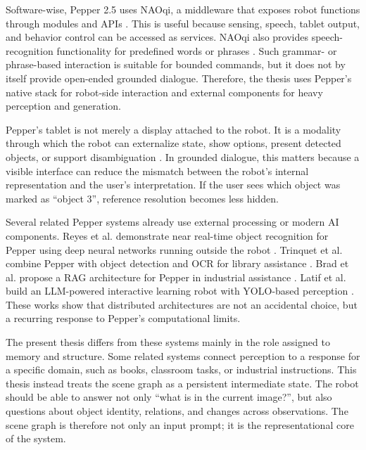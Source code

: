 Software-wise, Pepper 2.5 uses NAOqi, a middleware that exposes robot functions through modules and APIs \cite{softbank_python_sdk_2026}. This is useful because sensing, speech, tablet output, and behavior control can be accessed as services. NAOqi also provides speech-recognition functionality for predefined words or phrases \cite{softbank_alspeechrecognition_2026}. Such grammar- or phrase-based interaction is suitable for bounded commands, but it does not by itself provide open-ended grounded dialogue. Therefore, the thesis uses Pepper's native stack for robot-side interaction and external components for heavy perception and generation.

Pepper's tablet is not merely a display attached to the robot. It is a modality through which the robot can externalize state, show options, present detected objects, or support disambiguation \cite{softbank_peppers_tablet_2026}. In grounded dialogue, this matters because a visible interface can reduce the mismatch between the robot's internal representation and the user's interpretation. If the user sees which object was marked as \enquote{object 3}, reference resolution becomes less hidden.

Several related Pepper systems already use external processing or modern AI components. Reyes et al. demonstrate near real-time object recognition for Pepper using deep neural networks running outside the robot \cite{reyes_near_2018}. Trinquet et al. combine Pepper with object detection and OCR for library assistance \cite{trinquet_future_2025}. Brad et al. propose a RAG architecture for Pepper in industrial assistance \cite{brad_retrieval-augmented_2025}. Latif et al. build an LLM-powered interactive learning robot with YOLO-based perception \cite{latif_physicsassistant_2024}. These works show that distributed architectures are not an accidental choice, but a recurring response to Pepper's computational limits.

The present thesis differs from these systems mainly in the role assigned to memory and structure. Some related systems connect perception to a response for a specific domain, such as books, classroom tasks, or industrial instructions. This thesis instead treats the scene graph as a persistent intermediate state. The robot should be able to answer not only \enquote{what is in the current image?}, but also questions about object identity, relations, and changes across observations. The scene graph is therefore not only an input prompt; it is the representational core of the system.

